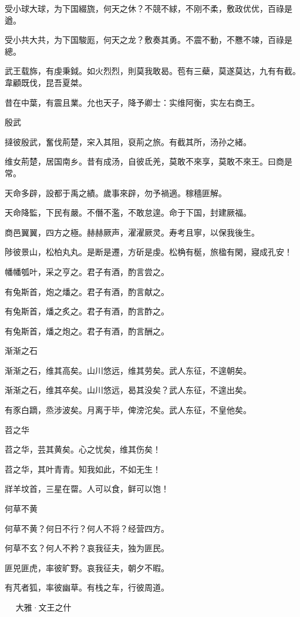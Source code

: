 受小球大球，为下国綴旒，何天之休？不競不絿，不刚不柔，敷政优优，百祿是遒。

受小共大共，为下国駿厖，何天之龙？敷奏其勇。不震不動，不戁不竦，百祿是總。

武王载旆，有虔秉鉞。如火烈烈，則莫我敢曷。苞有三蘗，莫遂莫达，九有有截。韋顧既伐，昆吾夏桀。

昔在中葉，有震且業。允也天子，降予卿士：实维阿衡，实左右商王。

殷武

撻彼殷武，奮伐荊楚，穼入其阻，裒荊之旅。有截其所，汤孙之緒。

维女荊楚，居国南乡。昔有成汤，自彼氐羌，莫敢不來享，莫敢不來王。曰商是常。

天命多辟，設都于禹之績。歲事來辟，勿予禍適。稼穡匪解。

天命降監，下民有嚴。不僭不濫，不敢怠遑。命于下国，封建厥福。

商邑翼翼，四方之極。赫赫厥声，濯濯厥灵。寿考且寧，以保我後生。

陟彼景山，松柏丸丸。是断是遷，方斫是虔。松桷有梴，旅楹有閑，寢成孔安！

幡幡瓠叶，采之亨之。君子有酒，酌言尝之。

有兔斯首，炮之燔之。君子有酒，酌言献之。

有兔斯首，燔之炙之。君子有酒，酌言酢之。

有兔斯首，燔之炮之。君子有酒，酌言酬之。

渐渐之石

渐渐之石，维其高矣。山川悠远，维其劳矣。武人东征，不遑朝矣。

渐渐之石，维其卒矣。山川悠远，曷其没矣？武人东征，不遑出矣。

有豕白蹢，烝涉波矣。月离于毕，俾滂沱矣。武人东征，不皇他矣。

苕之华

苕之华，芸其黄矣。心之忧矣，维其伤矣！

苕之华，其叶青青。知我如此，不如无生！

牂羊坟首，三星在罶。人可以食，鲜可以饱！

何草不黄

何草不黄？何日不行？何人不将？经营四方。

何草不玄？何人不矜？哀我征夫，独为匪民。

匪兕匪虎，率彼旷野。哀我征夫，朝夕不暇。

有芃者狐，率彼幽草。有栈之车，行彼周道。



　
大雅·文王之什



